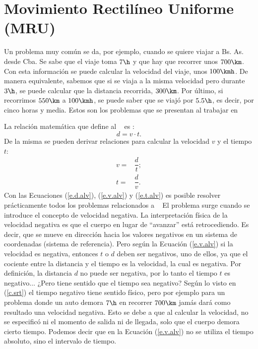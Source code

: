 \section{Movimiento Rectilíneo Uniforme (MRU)}
\label{c.mru}


Un problema muy común se da, por ejemplo, cuando se quiere viajar a Bs. As. desde
Cba. Se sabe que el viaje toma $7\h$ y que hay que recorrer unos $700\km$. Con
esta información se puede calcular la velocidad del viaje, unos $100\kmh$. 
De manera equivalente, sabemos que si se viaja a la misma velocidad pero durante
$3\h$, se puede calcular que la distancia recorrida, $300\km$. Por último, si
recorrimos $550\km$ a $100\kmh$, se puede saber que se viajó por $5.5\h$, es
decir, por cinco horas y media. Estos son los problemas que se presentan al
trabajar en \mru

La relación matemática que define al \mru~ es \parencite[64]{alvarenga}:
\begin{equation}
  d = v \cdot t.
  \label{e.d.alv}
\end{equation}
De la misma se pueden derivar relaciones para calcular la velocidad $v$ y el
tiempo $t$:
\begin{align}  
  v = & \dfrac{d}{t}; \label{e.v.alv}\\ 
  t = & \dfrac{d}{v}.  \label{e.t.alv}
\end{align}
Con las Ecuaciones (\ref{e.d.alv}), (\ref{e.v.alv}) y (\ref{e.t.alv}) es posible
resolver prácticamente todos los problemas relacionados a \mru~ El problema
surge cuando se introduce el concepto de velocidad negativa. La interpretación
física de la velocidad negativa es que el cuerpo en lugar de ``avanzar'' está
retrocediendo. Es decir, que se mueve en dirección hacia los valores negativos
en un sistema de coordenadas (sistema de referencia). Pero según la Ecuación
(\ref{e.v.alv}) si la velocidad es negativa, entonces $t$ o $d$ deben ser
negativos, uno de ellos, ya que el cociente entre la distancia y el tiempo es la
velocidad, la cual es negativa. Por definición, la distancia $d$ no puede ser
negativa, por lo tanto el tiempo $t$ es negativo$\ldots$ ¿Pero tiene sentido que
el tiempo sea negativo? Según lo visto en (\ref{c.srt}) el tiempo negativo tiene
sentido físico, pero por ejemplo para un problema donde un auto demora $7\h$ en
recorrer $700\km$ jamás dará como resultado una velocidad negativa. Esto se debe
a que al calcular la velocidad, no se especificó ni el momento de salida ni de
llegada, solo que el cuerpo demora cierto tiempo. Podemos decir que en la
Ecuación (\ref{e.v.alv}) no se utiliza el tiempo absoluto, sino el intervalo de
tiempo.

